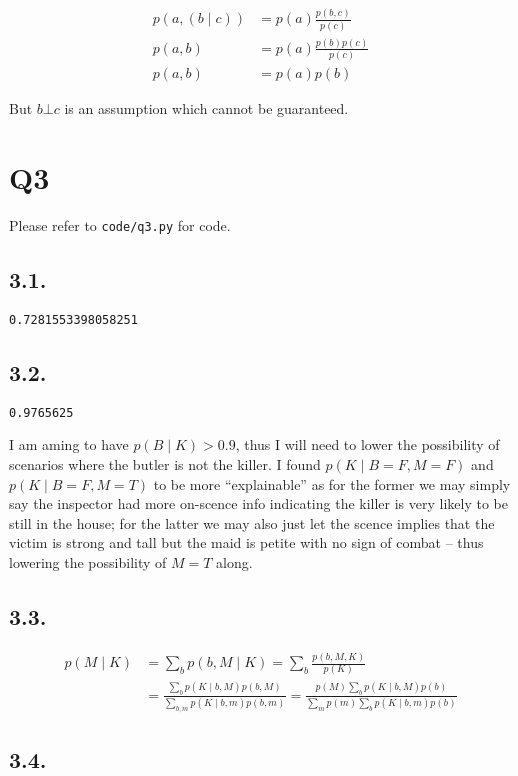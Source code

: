 \documentclass[11pt]{article}
\newcommand{\ilc}{\texttt}
\begin{document}
\begin{align*}
    p(a, (b  \mid  c)) &= p(a)\frac{p(b, c)}{p(c)} \\
    p(a, b) &= p(a) \frac{p(b)p(c)}{p(c)} \\
    p(a, b) &= p(a)p(b)
\end{align*}

But $b \bot c$ is an assumption which cannot be guaranteed.

\section*{Q3}

Please refer to \ilc{code/q3.py} for code.

\subsection*{3.1.}

\ilc{0.7281553398058251}

\subsection*{3.2.}
\ilc{0.9765625}

I am aming to have $p(B  \mid  K) > 0.9$, thus I will need to lower the possibility of scenarios where the butler is not the killer. I found $p(K  \mid  B = F, M = F)$ and $p(K  \mid  B = F, M = T)$ to be more ``explainable'' as for the former we may simply say the inspector had more on-scence info indicating the killer is very likely to be still in the house; for the latter we may also just let the scence implies that the victim is strong and tall but the maid is petite with no sign of combat -- thus lowering the possibility of $M=T$ along.

\subsection*{3.3.}

\begin{align*}
    p(M  \mid  K) &= \sum_{b}p(b,M \mid K) =\sum_{b}\frac{p(b,M,K)}{p(K)} \\
    &= \frac{\sum_{b}p(K \mid b,M)p(b,M)}{\sum_{b,m}p(K \mid b,m)p(b,m)} = \frac{p(M)\sum_{b}p(K \mid b,M)p(b)}{\sum_{m}p(m)\sum_{b}p(K \mid b,m)p(b)}
\end{align*}

\subsection*{3.4.}
\end{document}
